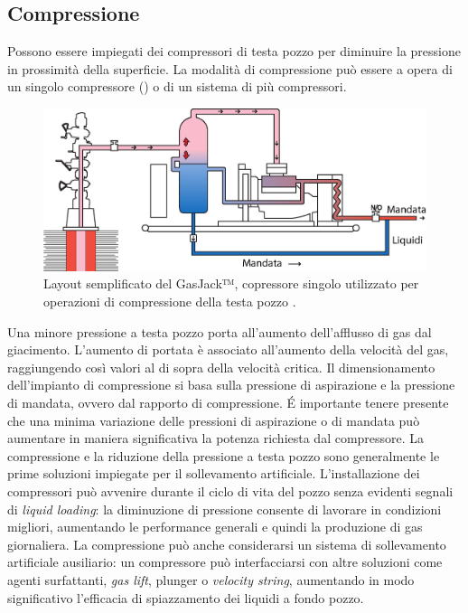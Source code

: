 \subsection{Compressione}
Possono essere impiegati dei compressori di testa pozzo per diminuire la pressione in prossimità della superficie. La modalità di compressione può essere a opera di un singolo compressore () o di un sistema di più compressori.

\begin{figure}[htbp]
    \centering
    \includegraphics[width=\textwidth]{fig/foamer/compressore.eps}
    \caption{Layout semplificato del GasJack™, copressore singolo utilizzato per operazioni di compressione della testa pozzo \parencite{garner2009backside}.}
    \label{fig:compressore}
\end{figure}

Una minore pressione a testa pozzo porta all'aumento dell'afflusso di gas dal giacimento. L'aumento di portata è associato all'aumento della velocità del gas, raggiungendo così valori al di sopra della velocità critica. Il dimensionamento dell'impianto di compressione si basa sulla pressione di aspirazione e la pressione di mandata, ovvero dal rapporto di compressione. \'E importante tenere presente che una minima variazione delle pressioni di aspirazione o di mandata può aumentare in maniera significativa la potenza richiesta dal compressore. La compressione e la riduzione della pressione a testa pozzo sono generalmente le prime soluzioni impiegate per il sollevamento artificiale. L'installazione dei compressori può avvenire durante il ciclo di vita del pozzo senza evidenti segnali di \textit{liquid loading}: la diminuzione di pressione consente di lavorare in condizioni migliori, aumentando le performance generali e quindi la produzione di gas giornaliera. La compressione può anche considerarsi un sistema di sollevamento artificiale ausiliario: un compressore può interfacciarsi con altre soluzioni come agenti surfattanti, \textit{gas lift}, plunger o \textit{velocity string}, aumentando in modo significativo l'efficacia di spiazzamento dei liquidi a fondo pozzo.

